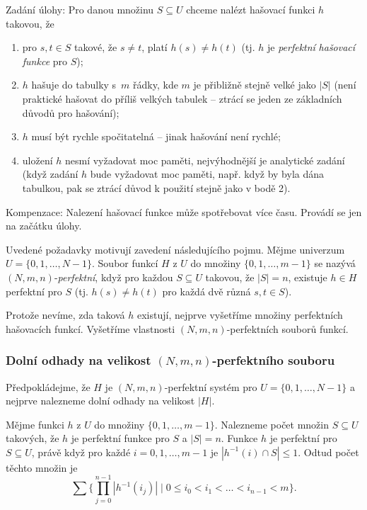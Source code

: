 \documentclass[a4paper,12pt]{article}
\begin{document}
Zadání úlohy: Pro danou množinu $S\subseteq 
U$ chceme 
nalézt hašo\-va\-cí funkci $h$ takovou, že
\begin{enumerate}
\item
pro $s,t\in S$ takové, že $s\ne t$, platí $h(s)\ne h(t)$ (tj. $
h$ je \emph{perfektní} \emph{hašovací} \emph{funkce} pro 
$S$); 
\item
$h$ hašuje do tabulky s~$m$ řádky, kde $m$ je přibližně 
stejně velké jako $|S|$ (není praktické hašovat do příliš 
velkých tabulek -- ztrácí se jeden ze základních 
důvodů pro hašování); 
\item
$h$ musí být rychle spočitatelná -- jinak hašování 
není rychlé;
\item
uložení $h$ nesmí vyžadovat moc paměti, 
nejvýhodnější je ana\-lytické zadání (když zadání $
h$ bude 
vyžadovat moc paměti, např. když by byla dána tabulkou, 
pak se ztrácí důvod k použití stejně jako v 
bodě 2).
\end{enumerate}

Kompenzace: Nalezení hašovací funkce 
může spotřebovat více času. Provádí se jen na 
začátku úlohy. 

Uvedené požadavky motivují zavedení 
následujícího pojmu.\newline 
Mějme univerzum $U=\{0,1,\dots,N-1\}$. Soubor funkcí $H$ z 
$U$ do množiny $\{0,1,\dots,m-1\}$ se nazývá 
$(N,m,n)$-\emph{perfektní}, když pro každou $S\subseteq 
U$ 
takovou, že $|S|=n$, existuje $h\in H$ perfektní pro $S$ (tj. 
$h(s)\ne h(t)$ pro každá dvě různá $s,t\in S$).

Protože nevíme, zda taková $h$ existují, nejprve 
vyšetříme mno\-ži\-ny perfektních hašovacích 
funkcí. Vyšetříme vlastnosti $(N,m,n)$-perfektních 
souborů funkcí.

\subsubsection{Dolní odhady na velikost $(N,m,n)$-perfektního souboru}

Předpokládejme, že $H$  je $(N,m,n)$-perfektní 
systém pro $U=\{0,1,\dots,N-1\}$ a nejprve nalezneme dolní 
odhady na velikost $|H|$.

Mějme funkci $h$ z $U$ do množiny $\{0,1,\dots,m-
1\}$. 
Nalezneme počet množin $S\subseteq U$ takových, že  
$h$ je perfektní funkce pro $S$ a $|S|=n$. Funkce $h$ je perfektní pro 
$S\subseteq U$, právě když pro každé $i=0,1,\dots,m-
1$ je 
$|h^{-1}(i)\cap S|\le 1$. Odtud počet těchto množin je
$$\sum \{\prod_{j=0}^{n-1}|h^{-1}(i_j)|\mid 0\le i_0<i_1<\dots<i_{
n-1}<m\}.$$
\end{document}
